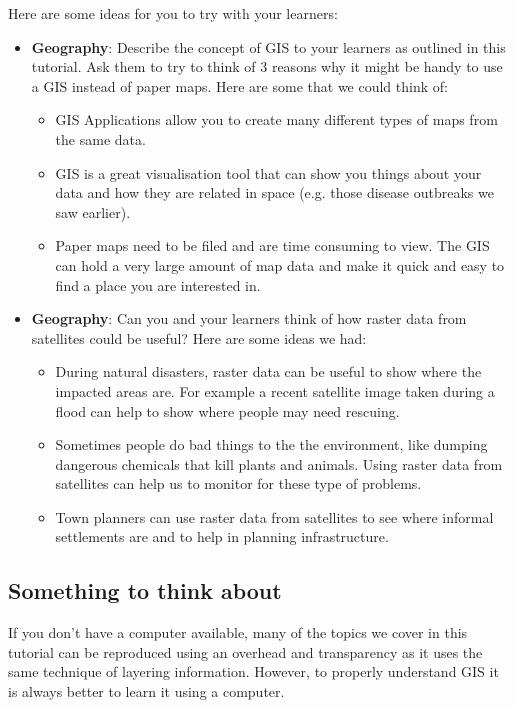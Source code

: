 Here are some ideas for you to try with your learners:

\begin{itemize}
\item \textbf{Geography}: Describe the concept of GIS to your learners as
outlined in this tutorial. Ask them to try to think of 3 reasons why it might
be handy to use a GIS instead of paper maps. Here are some that we could
think of:
\begin{itemize}
\item GIS Applications allow you to create many different types of maps from
the same data.
\item GIS is a great visualisation tool that can show you things about your
data and how they are related in space (e.g. those disease outbreaks we saw
earlier).
\item Paper maps need to be filed and are time consuming to view. The GIS can
hold a very large amount of map data and make it quick and easy to find a place
you are interested in.
\end{itemize}
\end{itemize}

\begin{itemize}
\item \textbf{Geography}: Can you and your learners think of how raster data
from satellites could be useful? Here are some ideas we had:
\begin{itemize}
\item During natural disasters, raster data can be useful to show where the
impacted areas are. For example a recent satellite image taken during a flood
can help to show where people may need rescuing.
\item Sometimes people do bad things to the the environment, like dumping
dangerous chemicals that kill plants and animals. Using raster data from
satellites can help us to monitor for these type of problems.
\item Town planners can use raster data from satellites to see where informal
settlements are and to help in planning infrastructure.
\end{itemize}
\end{itemize}

\subsection{Something to think about}

If you don't have a computer available, many of the topics we cover in this
tutorial can be reproduced using an overhead and transparency as it uses the
same technique of layering information. However, to properly understand GIS
it is always better to learn it using a computer.

